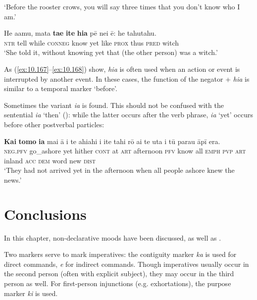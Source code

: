 \glt 
‘Before the rooster crows, you will say three times that you don’t know who I am.’ \textstyleExampleref{[Jhn. 13:38]}
\z

\ea\label{ex:10.169}
\gll He {\ꞌ}a{\ꞌ}amu, mata \textbf{ta{\ꞌ}e} \textbf{{\ꞌ}ite} \textbf{hia} pē nei ē: he tahutahu. \\
\textsc{ntr} tell while \textsc{conneg} know yet like \textsc{prox} thus \textsc{pred} witch \\

\glt
‘She told it, without knowing yet that (the other person) was a witch.’ \textstyleExampleref{[R532-07.044]}
\z

As (\ref{ex:10.167}–\ref{ex:10.168}) show, \textit{hia} is often used when an action or event is interrupted by another event. In these cases, the function of the negator + \textit{hia} is similar to a temporal marker ‘before’.

Sometimes the variant \textit{ia} is found. This should not be confused with the sentential  \textit{ia} ‘then’ (): while the latter occurs after the verb phrase, \textit{ia} ‘yet’ occurs before other postverbal particles:

\ea\label{ex:10.170}
\gll \textbf{Kai} \textbf{tomo} \textbf{ia} mai {\ꞌ}ā {\ꞌ}i te ahiahi i {\ꞌ}ite tahi rō ai te {\ꞌ}uta i tū parau {\ꞌ}āpī era.\\
\textsc{neg.pfv} go\_ashore yet hither \textsc{cont}\textsc{} at \textsc{art} afternoon \textsc{pfv} know all \textsc{emph} \textsc{pvp} \textsc{art} inland \textsc{acc} \textsc{dem} word new \textsc{dist}\\

\glt 
‘They had not arrived yet in the afternoon when all people ashore knew the news.’ \textstyleExampleref{[R345.015]}\textstyleExampleref{} 
\z
{}

\newpage 
\section{Conclusions}\label{sec:10.6}

In this chapter, non-declarative moods have been discussed, as well as .

Two  markers serve to mark imperatives: the contiguity marker \textit{ka} is used for direct commands,  \textit{e} for indirect commands. Though imperatives usually occur in the second person (often with explicit subject), they may occur in the third person as well. For first-person injunctions (e.g. exhortations), the purpose marker \textit{ki} is used. 

